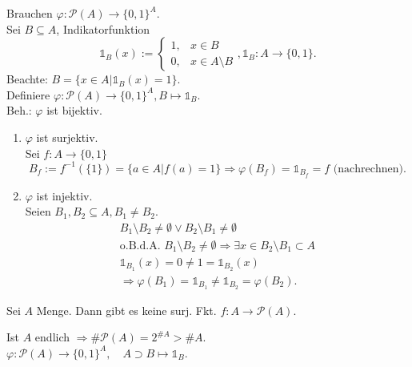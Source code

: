 \documentclass[../ana1.tex]{subfiles}
\begin{document}
\begin{bew}
	Brauchen \(\varphi : \mathcal{P}(A) \rightarrow {\{0,1\}}^A \).\\
	Sei \(B \subseteq A \), Indikatorfunktion \[ \mathds{1}_B(x) := \begin{cases}
			1, & x\in B            \\
			0, & x\in A\setminus B
		\end{cases}
		, \mathds{1}_B : A \rightarrow \{0,1\}. \]
	Beachte: \(B = \{x\in A | \mathds{1}_B(x) = 1 \} \).\\
	Definiere \( \varphi : \mathcal{P}(A) \rightarrow {\{0,1\}}^A, B \mapsto \mathds{1}_B \).\\
	Beh.: \(\varphi \) ist bijektiv.
	\begin{enumerate}
		\item \( \varphi \) ist surjektiv.\\
		      Sei \(f: A\rightarrow \{0,1\} \)
		      \[ B_f := f^{-1} (\{1\}) = \{a \in A| f(a) = 1 \} \Rightarrow \varphi(B_f) = \mathds{1}_{B_f} = f\text{ (nachrechnen)}.\]
		\item \( \varphi \) ist injektiv.\\
		      Seien \( B_1,B_2\subseteq A, B_1 \neq B_2 \).
		      \begin{align*}
			      B_1\setminus B_2 \neq \emptyset \vee B_2\setminus B_1 \neq \emptyset                                    \\
			      \text{o.B.d.A. } B_1 \setminus B_2 \neq \emptyset \Rightarrow \exists x \in B_2 \setminus B_1 \subset A \\
			      \mathds{1}_{B_1}(x) = 0 \neq 1 = \mathds{1}_{B_2}(x)                                                    \\
			      \Rightarrow \varphi(B_1) = \mathds{1}_{B_1} \neq \mathds{1}_{B_2} = \varphi(B_2).
		      \end{align*}
	\end{enumerate}
\end{bew}
\begin{lem}
	Sei \(A\) Menge. Dann gibt es keine surj. Fkt. \(f: A\rightarrow \mathcal{P}(A) \).
\end{lem}
\begin{bem}
	Ist \(A\) endlich \( \Rightarrow \# \mathcal{P} (A) = 2^{\# A} > \#A \).\\
	\( \varphi: \mathcal{P}(A) \rightarrow {\{0,1\}}^A, \quad A\supset B \mapsto \mathds{1}_B \).
\end{bem}
\end{document}

